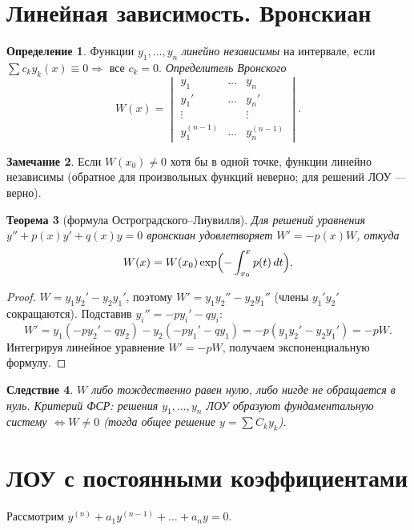 \documentclass[11pt,a4paper]{article}
\theoremstyle{definition}
\newtheorem{definition}{Определение}[section]
\newtheorem{remark}[definition]{Замечание}
\theoremstyle{plain}
\newtheorem{theorem}[definition]{Теорема}
\newtheorem{corollary}[definition]{Следствие}
\begin{document}
\section{Линейная зависимость. Вронскиан}

\begin{definition}
Функции $y_1,\dots,y_n$ \emph{линейно независимы} на интервале, если
$\sum c_k y_k(x)\equiv0\Rightarrow$ все $c_k=0$. \emph{Определитель Вронского}
\[
  W(x)=\begin{vmatrix} y_1 & \dots & y_n\\ y_1' & \dots & y_n'\\ \vdots & & \vdots\\
  y_1^{(n-1)} & \dots & y_n^{(n-1)}\end{vmatrix}.
\]
\end{definition}

\begin{remark}
Если $W(x_0)\ne0$ хотя бы в одной точке, функции линейно независимы (обратное для произвольных
функций неверно; для решений ЛОУ — верно).
\end{remark}

\begin{theorem}[формула Остроградского–Лиувилля]
Для решений уравнения $y''+p(x)y'+q(x)y=0$ вронскиан удовлетворяет $W'=-p(x)W$, откуда
\[
  W(x)=W(x_0)\exp\Bigl(-\int_{x_0}^x p(t)\,dt\Bigr).
\]
\end{theorem}

\begin{proof}
$W=y_1y_2'-y_2y_1'$, поэтому $W'=y_1y_2''-y_2y_1''$ (члены $y_1'y_2'$ сокращаются). Подставив
$y_i''=-p y_i'-q y_i$:
\[
  W'=y_1(-p y_2'-q y_2)-y_2(-p y_1'-q y_1)=-p(y_1y_2'-y_2y_1')=-pW .
\]
Интегрируя линейное уравнение $W'=-pW$, получаем экспоненциальную формулу.
\end{proof}

\begin{corollary}
$W$ либо тождественно равен нулю, либо нигде не обращается в нуль. \emph{Критерий ФСР:} решения
$y_1,\dots,y_n$ ЛОУ образуют фундаментальную систему $\iff W\ne0$ (тогда общее решение
$y=\sum C_k y_k$).
\end{corollary}

\section{ЛОУ с постоянными коэффициентами}

Рассмотрим $y^{(n)}+a_1y^{(n-1)}+\dots+a_n y=0$.
\end{document}
